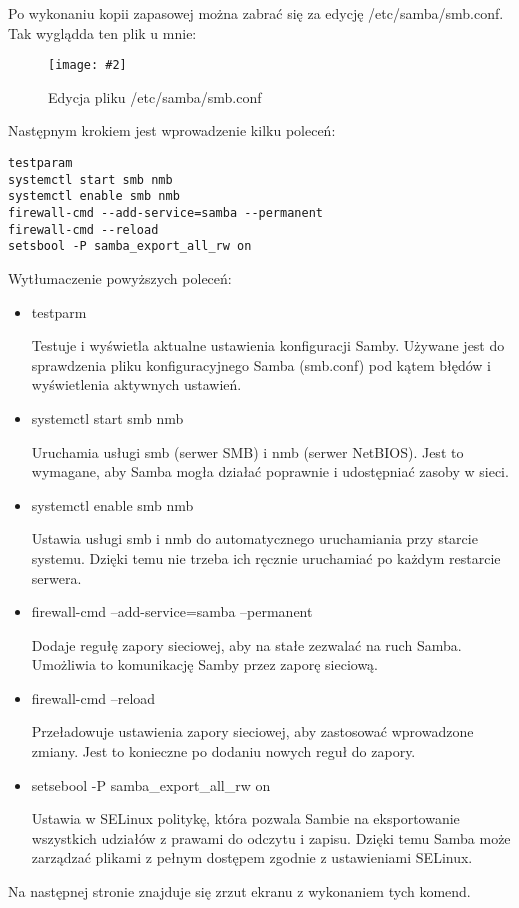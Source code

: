 \documentclass[a4paper]{article}
\newcommand*{\zdj}[2][\textwidth]{\texttt{[image: \#2]}}
\newcommand*{\fg}[4][!htb]{
      \begin{figure*}[#1]
            \zdj{#2}
            \caption[#4]{#3}
      \end{figure*}
}
\begin{document}
Po wykonaniu kopii zapasowej można zabrać się za edycję /etc/samba/smb.conf. Tak wyglądda ten plik u mnie: 
\fg{contents/configuration/Samba/3.png}{Edycja pliku /etc/samba/smb.conf}{Edycja pliku /etc/samba/smb.conf}

\newpage
Następnym krokiem jest wprowadzenie kilku poleceń: 
\begin{Verbatim}[frame=single]
testparam
systemctl start smb nmb
systemctl enable smb nmb
firewall-cmd --add-service=samba --permanent
firewall-cmd --reload
setsbool -P samba_export_all_rw on
\end{Verbatim}

Wytłumaczenie powyższych poleceń:
\begin{itemize}
      \item testparm
      
      Testuje i wyświetla aktualne ustawienia konfiguracji Samby. Używane jest do sprawdzenia pliku konfiguracyjnego Samba (smb.conf) pod kątem błędów i wyświetlenia aktywnych ustawień.
      
      \item systemctl start smb nmb
      
      Uruchamia usługi smb (serwer SMB) i nmb (serwer NetBIOS). Jest to wymagane, aby Samba mogła działać poprawnie i udostępniać zasoby w sieci.
      
      \item systemctl enable smb nmb
      
      Ustawia usługi smb i nmb do automatycznego uruchamiania przy starcie systemu. Dzięki temu nie trzeba ich ręcznie uruchamiać po każdym restarcie serwera.
      
      \item firewall-cmd --add-service=samba --permanent
      
      Dodaje regułę zapory sieciowej, aby na stałe zezwalać na ruch Samba. Umożliwia to komunikację Samby przez zaporę sieciową.
      
      \item firewall-cmd --reload
      
      Przeładowuje ustawienia zapory sieciowej, aby zastosować wprowadzone zmiany. Jest to konieczne po dodaniu nowych reguł do zapory.
      
      \item setsebool -P samba\_export\_all\_rw on
      
      Ustawia w SELinux politykę, która pozwala Sambie na eksportowanie wszystkich udziałów z prawami do odczytu i zapisu. Dzięki temu Samba może zarządzać plikami z pełnym dostępem zgodnie z ustawieniami SELinux.
\end{itemize}
Na następnej stronie znajduje się zrzut ekranu z wykonaniem tych komend.
\newpage 
      
\end{document}

